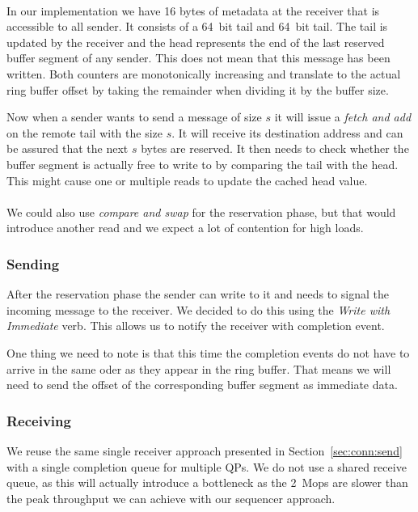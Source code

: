 \paragraph{} In our implementation we have 16 bytes of metadata at the receiver that is accessible to all sender. It consists
of a 64~bit tail and 64~bit tail. The tail is updated by the receiver and the head represents the end of the last reserved 
buffer segment of any sender. This does not mean that this message has been written. Both counters are monotonically increasing
and translate to the actual ring buffer offset by taking the remainder when dividing it by the buffer size.

Now when a sender wants to send a message of size $s$ it will issue a \emph{fetch and add} on the remote tail with the 
size $s$. It will receive its destination address and can be assured that the next $s$ bytes are reserved. It then needs
to check whether the buffer segment is actually free to write to by comparing the tail with the head. This might cause one 
or multiple reads to update the cached head value.

\paragraph{} We could also use \emph{compare and swap} for the reservation phase, but that would introduce another read and
we expect a lot of contention for high loads.

\subsubsection{Sending}
After the reservation phase the sender can write to it and needs to signal the incoming message to the receiver. We decided 
to do this using the \emph{Write with Immediate} verb. This allows us to notify the receiver with completion event. 

One thing we need to note is that this time the completion events do not have to arrive in the same oder as they appear in
the ring buffer. That means we will need to send the offset of the corresponding buffer segment as immediate data.


\subsubsection{Receiving}
We reuse the same single receiver approach presented in Section~\ref{sec:conn:send} with a single completion queue for multiple
QPs. We do not use a shared receive queue, as this will actually introduce a bottleneck as the 2~Mops are slower than the 
peak throughput we can achieve with our sequencer approach.

